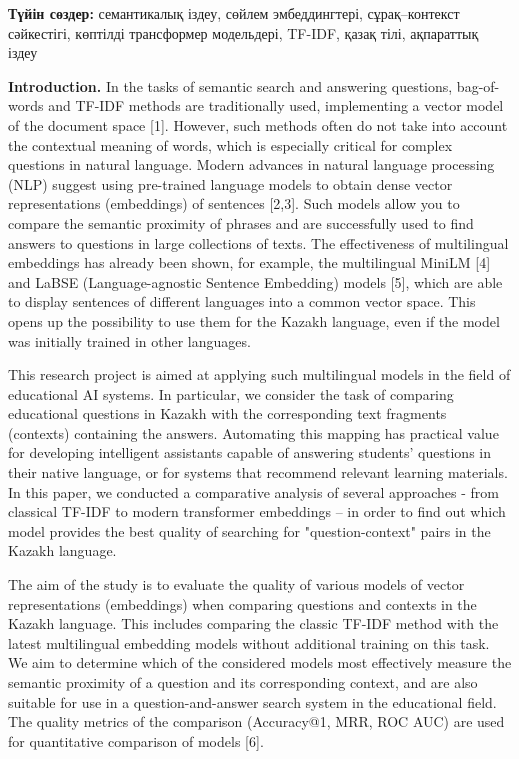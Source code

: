 {\bfseries Түйін сөздер:} семантикалық іздеу, сөйлем эмбеддингтері,
сұрақ--контекст сәйкестігі, көптілді трансформер модельдері, TF-IDF,
қазақ тілі, ақпараттық іздеу

\begin{multicols}{2}
{\bfseries Introduction.} In the tasks of semantic search and answering
questions, bag-of-words and TF-IDF methods are traditionally used,
implementing a vector model of the document space {[}1{]}. However, such
methods often do not take into account the contextual meaning of words,
which is especially critical for complex questions in natural language.
Modern advances in natural language processing (NLP) suggest using
pre-trained language models to obtain dense vector representations
(embeddings) of sentences {[}2,3{]}. Such models allow you to compare
the semantic proximity of phrases and are successfully used to find
answers to questions in large collections of texts. The effectiveness of
multilingual embeddings has already been shown, for example, the
multilingual MiniLM {[}4{]} and LaBSE (Language-agnostic Sentence
Embedding) models {[}5{]}, which are able to display sentences of
different languages into a common vector space. This opens up the
possibility to use them for the Kazakh language, even if the model was
initially trained in other languages.

This research project is aimed at applying such multilingual models in
the field of educational AI systems. In particular, we consider the task
of comparing educational questions in Kazakh with the corresponding text
fragments (contexts) containing the answers. Automating this mapping has
practical value for developing intelligent assistants capable of
answering students'{} questions in their native language,
or for systems that recommend relevant learning materials. In this
paper, we conducted a comparative analysis of several approaches - from
classical TF-IDF to modern transformer embeddings -- in order to find
out which model provides the best quality of searching for
"question-context" pairs in the Kazakh language.

The aim of the study is to evaluate the quality of various models of
vector representations (embeddings) when comparing questions and
contexts in the Kazakh language. This includes comparing the classic
TF-IDF method with the latest multilingual embedding models without
additional training on this task. We aim to determine which of the
considered models most effectively measure the semantic proximity of a
question and its corresponding context, and are also suitable for use in
a question-and-answer search system in the educational field. The
quality metrics of the comparison (Accuracy@1, MRR, ROC AUC) are used
for quantitative comparison of models {[}6{]}.


\end{multicols}
